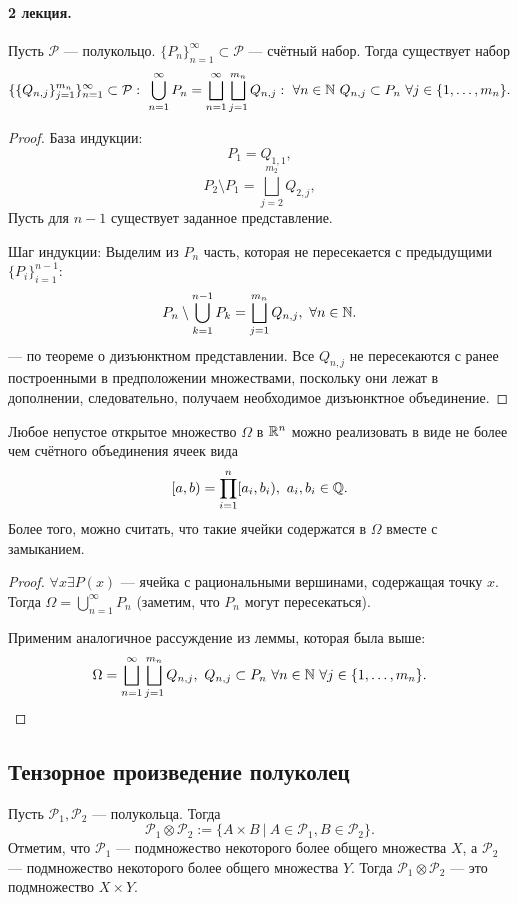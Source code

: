 \paragraph{2 лекция.}


\begin{lemma}
    Пусть $\mathcal{P}$ — полукольцо. $\{P_n\}_{n=1}^{\infty} \subset \mathcal{P}$ — счётный набор. Тогда существует набор
    \[
    \{
        \{Q_{n,j}\}_{j=1}^{m_n}
    \}_{n=1}^{\infty} \subset \mathcal{P}:
    \
    \bigcup\limits_{n=1}^{\infty} P_n = \bigsqcup\limits_{n=1}^{\infty} \bigsqcup_{j=1}^{m_n} Q_{n,j}: \
    \forall n \in \mathbb{N} \ Q_{n,j} \subset P_n \ \forall j \in \{1, \dots, m_n\}.
    \]
\end{lemma} 
\begin{proof}
    База индукции:
    \[P_1 = Q_{1,1},\]
    \[P_2 \setminus P_1 = \bigsqcup_{j=2}^{m_2} Q_{2,j},\]
    Пусть для $n-1$ существует заданное представление.

    \noindent Шаг индукции:
    Выделим из $P_n$ часть, которая не пересекается с предыдущими $\{P_i\}_{i=1}^{n-1}$:
    \[P_n \setminus \bigcup\limits_{k=1}^{n-1} P_k = \bigsqcup\limits_{j=1}^{m_n} Q_{n,j}, \ \forall n \in \mathbb{N}.\]
    — по теореме о дизъюнктном представлении.
    Все $Q_{n,j}$ не пересекаются с ранее построенными в предположении множествами, поскольку они лежат в дополнении, следовательно, получаем необходимое дизъюнктное объединение.
\end{proof} 

\begin{corollary}
    Любое непустое открытое множество $\Omega$ в $\mathbb{R}^n$ можно реализовать в виде не более чем счётного объединения ячеек вида
    \[[a,b) = \prod_{i=1}^n [a_i, b_i), \ a_i, b_i \in \mathbb{Q}.\]
    Более того, можно считать, что такие ячейки содержатся в $\Omega$ вместе с замыканием.
\end{corollary}
\begin{proof}
    $\forall x \exists P(x)$ — ячейка с рациональными вершинами, содержащая точку $x$. Тогда $\Omega = \bigcup\limits_{n=1}^{\infty} P_n$ (заметим, что $P_n$ могут пересекаться).

    Применим аналогичное рассуждение из леммы, которая была выше:
    \[\Omega = \bigsqcup\limits_{n=1}^{\infty} \bigsqcup_{j=1}^{m_n} Q_{n,j}, \ Q_{n,j} \subset P_n \ \forall n \in \mathbb{N} \ \forall j \in \{1, \dots, m_n\}.\]
\end{proof} 

\subsection{Тензорное произведение полуколец}
\begin{definition}
    Пусть $\mathcal{P}_1, \mathcal{P}_2$ — полукольца. Тогда
    \[\mathcal{P}_1 \otimes \mathcal{P}_2 := \{A \times B \ | \ A \in \mathcal{P}_1, B \in \mathcal{P}_2\}.\]
    Отметим, что $\mathcal{P}_1$ — подмножество некоторого более общего множества $X$, а $\mathcal{P}_2$ — подмножество некоторого более общего множества $Y$. Тогда $\mathcal{P}_1 \otimes \mathcal{P}_2$ — это подмножество $X \times Y$.
\end{definition} 

